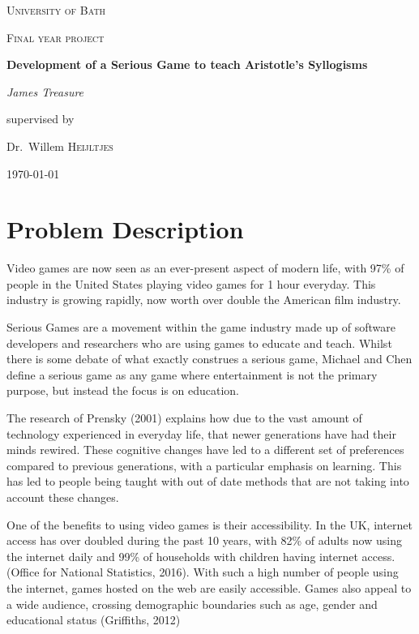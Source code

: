 \documentclass[12pt,a4paper]{report}
\begin{document}
\begin{titlepage}
	\centering
	{\scshape\LARGE University of Bath \par}
	\vspace{1cm}
	{\scshape\Large Final year project\par}
	\vspace{1.5cm}
	{\huge\bfseries Development of a Serious Game to teach Aristotle's Syllogisms\par}
	\vspace{2cm}
	{\Large\itshape James Treasure\par}
	\vfill
	supervised by\par
	Dr.~Willem \textsc{Heijltjes}
	\vfill
	{\large \today\par}
\end{titlepage}

\tableofcontents
\chapter{Problem Description}
Video games are now seen as an ever-present aspect of modern life, with 97\% of people in the United States playing video games for 1 hour everyday. This industry is growing rapidly, now worth over double the American film industry. 

Serious Games are a movement within the game industry made up of software developers and researchers who are using games to educate and teach. Whilst there is some debate of what exactly construes a serious game, Michael and Chen define a serious game as any game where entertainment is not the primary purpose, but instead the focus is on education. 

The research of Prensky (2001) explains how due to the vast amount of technology experienced in everyday life, that newer generations have had their minds rewired. These cognitive changes have led to a different set of preferences compared to previous generations, with a particular emphasis on learning. This has led to people being taught with out of date methods that are not taking into account these changes.

One of the benefits to using video games is their accessibility. In the UK, internet access has over doubled during the past 10 years, with 82\% of adults now using the internet daily and 99\% of households with children having internet access. (Office for National Statistics, 2016). With such a high number of people using the internet, games hosted on the web are easily accessible. Games also appeal to a wide audience, crossing demographic boundaries such as age, gender and educational status (Griffiths, 2012) 
\end{document}
